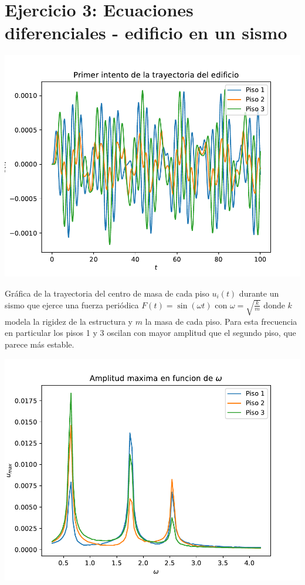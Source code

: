 \documentclass[11pt,letterpaper]{exam}
\begin{document}
\section{Ejercicio 3: Ecuaciones diferenciales - edificio en un sismo}
\begin{center}
\includegraphics[width=14cm]{3_PrimerEdificio.pdf}
\end{center}
Gráfica de la trayectoria del centro de masa de cada piso $u_i(t)$ durante un sismo que ejerce una fuerza periódica $F(t)=\sin(\omega t)$ con $\omega=\sqrt{\frac{k}{m}}$ donde $k$ modela la rigidez de la estructura y $m$ la masa de cada piso. Para esta frecuencia en particular los pisos 1 y 3 oscilan con mayor amplitud que el segundo piso, que parece más estable.
\begin{center}
\includegraphics[width=14cm]{3_Maximos.pdf}
\end{center}
\end{document}
